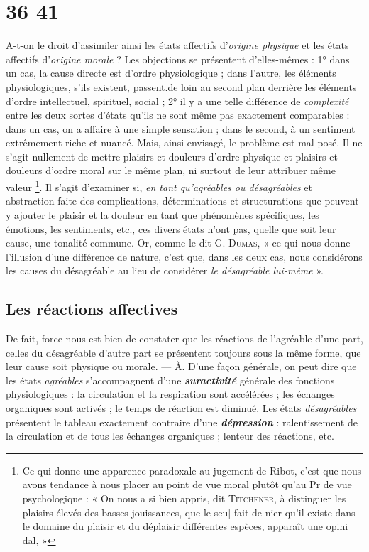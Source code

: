 
\section{36 41}
%
A-t-on le droit d’assimiler ainsi les états affectifs d’{\it origine physique} et
les états affectifs d’{\it origine morale} ? Les objections se présentent d'elles-mêmes :
1° dans un cas, la cause directe est d'ordre physiologique ;
dans l’autre, les éléments physiologiques, s’ils existent, passent.de
loin au second plan derrière les éléments d'ordre intellectuel, spirituel,
social ; 
2° il y a une telle différence de {\it complexité} entre les deux sortes
d'états qu’ils ne sont même pas exactement comparables : dans un
cas, on a affaire à une simple sensation ; dans le second, à un sentiment
extrêmement riche et nuancé. Mais, ainsi envisagé, le problème
est mal posé. Il ne s’agit nullement de mettre plaisirs et douleurs
d’ordre physique et plaisirs et douleurs d’ordre moral sur le même
plan, ni surtout de leur attribuer même valeur \footnote{
Ce qui donne une apparence paradoxale au jugement de Ribot, c'est que nous
avons tendance à nous placer au point de vue moral plutôt qu'au Pr de vue psychologique :
« On nous a si bien appris, dit \textsc{Titchener}, à distinguer les plaisirs élevés des
basses jouissances, que le seu] fait de nier qu'il existe dans le domaine du plaisir et du
déplaisir différentes espèces, apparaît une opini dal, »
}. Il s’agit d'examiner
si, {\it en tant qu'agréables ou désagréables} et abstraction faite des complications,
déterminations ct structurations que peuvent y ajouter le
plaisir et la douleur en tant que phénomènes spécifiques, les émotions,
les sentiments, etc., ces divers états n’ont pas, quelle que soit leur
cause, une tonalité commune. Or, comme le dit G. \textsc{Dumas}, « ce qui
nous donne l'illusion d’une différence de nature, c’est que, dans les
deux cas, nous considérons les causes du désagréable au lieu de
considérer {\it le désagréable lui-même} ».

\subsection{Les réactions affectives}%
De fait, force nous est bien de
constater que les réactions de l’agréable d’une part, celles du désagréable
d’autre part se présentent toujours sous la même forme, que
leur cause soit physique ou morale. — À. D’une façon générale, on
peut dire que les états {\it agréables} s’accompagnent d’une \textbf{\textit {suractivité}}
générale des fonctions physiologiques : la circulation et la respiration
sont accélérées ; les échanges organiques sont activés ; le temps de
réaction est diminué. Les états {\it désagréables} présentent le tableau
exactement contraire d’une \textbf{\textit {dépression}} : ralentissement de la circulation
et de tous les échanges organiques ; lenteur des réactions, etc.

